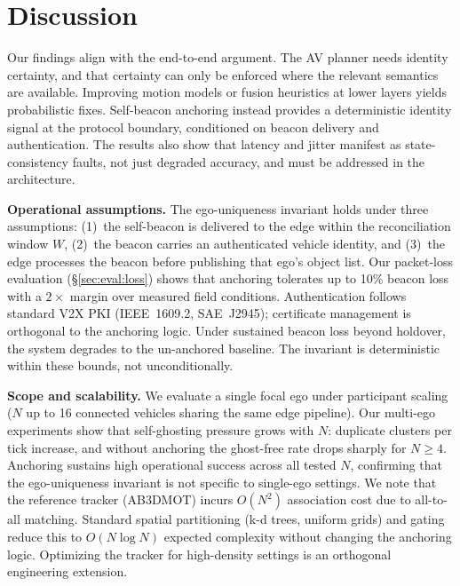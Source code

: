 \section{Discussion}
\label{sec:discussion}

Our findings align with the end-to-end argument. The AV planner needs identity certainty, and that certainty can only be enforced where the relevant semantics are available. Improving motion models or fusion heuristics at lower layers yields probabilistic fixes. Self-beacon anchoring instead provides a deterministic identity signal at the protocol boundary, conditioned on beacon delivery and authentication. The results also show that latency and jitter manifest as state-consistency faults, not just degraded accuracy, and must be addressed in the architecture.

\smallskip\noindent\textbf{Operational assumptions.}
The ego-uniqueness invariant holds under three assumptions: (1)~the self-beacon is delivered to the edge within the reconciliation window $W$, (2)~the beacon carries an authenticated vehicle identity, and (3)~the edge processes the beacon before publishing that ego's object list. Our packet-loss evaluation (\S\ref{sec:eval:loss}) shows that anchoring tolerates up to 10\% beacon loss with a $2{\times}$ margin over measured field conditions. Authentication follows standard V2X PKI (IEEE~1609.2, SAE~J2945); certificate management is orthogonal to the anchoring logic. Under sustained beacon loss beyond holdover, the system degrades to the un-anchored baseline. The invariant is deterministic within these bounds, not unconditionally.

\smallskip\noindent\textbf{Scope and scalability.}
We evaluate a single focal ego under participant scaling ($N$ up to 16 connected vehicles sharing the same edge pipeline). Our multi-ego experiments show that self-ghosting pressure grows with $N$: duplicate clusters per tick increase, and without anchoring the ghost-free rate drops sharply for $N \geq 4$. Anchoring sustains high operational success across all tested $N$, confirming that the ego-uniqueness invariant is not specific to single-ego settings. We note that the reference tracker (AB3DMOT) incurs $O(N^2)$ association cost due to all-to-all matching. Standard spatial partitioning (k\hbox{-}d trees, uniform grids) and gating reduce this to $O(N \log N)$ expected complexity without changing the anchoring logic. Optimizing the tracker for high-density settings is an orthogonal engineering extension.

